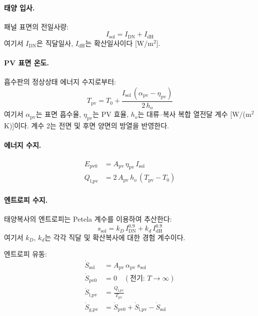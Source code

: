 \paragraph{태양 입사.}
패널 표면의 전일사량:
\begin{equation}\label{eq:pv-I-sol}
  I_\text{sol} = I_\text{DN} + I_\text{dH}
\end{equation}
여기서 $I_\text{DN}$은 직달일사, $I_\text{dH}$는 확산일사이다 [W/m$^2$].

\paragraph{PV 표면 온도.}
흡수판의 정상상태 에너지 수지로부터:
\begin{equation}\label{eq:pv-Tpv}
  T_\text{pv} = T_0 + \frac{I_\text{sol}\,(\alpha_\text{pv} - \eta_\text{pv})}{2\,h_o}
\end{equation}
여기서 $\alpha_\text{pv}$는 표면 흡수율, $\eta_\text{pv}$는 PV 효율, $h_o$는 대류--복사 복합 열전달 계수 [W/(m$^2$\,K)]이다. 계수 2는 전면 및 후면 양면의 방열을 반영한다.

\paragraph{에너지 수지.}
\begin{align}
  E_\text{pv0} &= A_\text{pv}\,\eta_\text{pv}\,I_\text{sol}     \label{eq:pv-Epv0} \\
  Q_\text{l,pv} &= 2\,A_\text{pv}\,h_o\,(T_\text{pv} - T_0)     \label{eq:pv-Qlpv}
\end{align}

\paragraph{엔트로피 수지.}
태양복사의 엔트로피는 Petela 계수를 이용하여 추산한다:
\begin{equation}\label{eq:pv-s-sol}
  s_\text{sol} = k_D\,I_\text{DN}^{0.9} + k_d\,I_\text{dH}^{0.9}
\end{equation}
여기서 $k_D$, $k_d$는 각각 직달 및 확산복사에 대한 경험 계수이다.

엔트로피 유동:
\begin{align}
  \dot{S}_\text{sol}  &= A_\text{pv}\,\alpha_\text{pv}\,s_\text{sol}   \label{eq:pv-Ssol}  \\
  \dot{S}_\text{pv0}  &= 0 \quad (\text{전기: } T \to \infty)            \label{eq:pv-Spv0}  \\
  \dot{S}_\text{l,pv} &= \frac{Q_\text{l,pv}}{T_\text{pv}}             \label{eq:pv-Slpv}  \\
  \dot{S}_\text{g,pv} &= \dot{S}_\text{pv0} + \dot{S}_\text{l,pv} - \dot{S}_\text{sol} \label{eq:pv-Sgpv}
\end{align}

